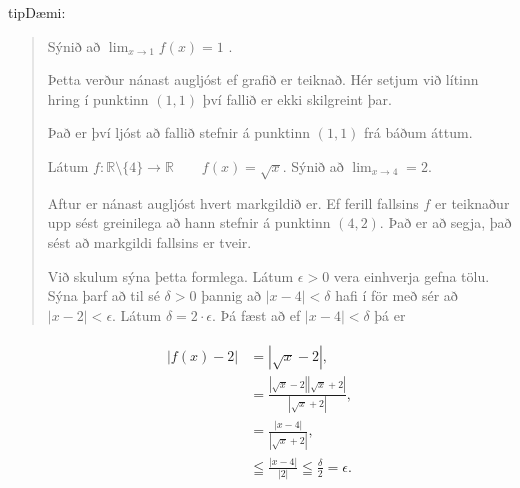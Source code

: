 \documentclass[a4paper,10pt,icelandic]{sphinxmanual}
\begin{document}
\begin{sphinxadmonition}{tip}{Dæmi:}
\begin{quote}
\begin{description}
Sýnið að \(\lim_{x \to 1} f(x) = 1\) .

Þetta verður nánast augljóst ef grafið er teiknað.
Hér setjum við lítinn hring í punktinn \((1, 1)\) því fallið er ekki skilgreint þar.

\begin{figure}[H]
\centering

\noindent{}
\end{figure}

Það er því ljóst að fallið stefnir á punktinn \((1, 1)\) frá báðum áttum.

\item[{\sphinxstylestrong{4.}}] \leavevmode
Látum \(f : \mathbb{R} \setminus \{4\} \to \mathbb{R} \qquad f(x) = \sqrt{x}\).
Sýnið að \(\lim_{x \to 4} = 2\).

Aftur er nánast augljóst hvert markgildið er.
Ef ferill fallsins \(f\) er teiknaður upp sést greinilega að hann stefnir á punktinn \((4, 2)\).
Það er að segja, það sést að markgildi fallsins er tveir.

\begin{figure}[H]
\centering

\noindent{}
\end{figure}

Við skulum sýna þetta formlega.
Látum \(\epsilon > 0\) vera einhverja gefna tölu.
Sýna þarf að til sé \(\delta>0\) þannig að \(|x−4|<\delta\) hafi í för með sér að \(| x−2|<\epsilon\). Látum \(\delta = 2 \cdot \epsilon\).
Þá fæst að ef \(|x − 4| < \delta\) þá er

\end{description}
\end{quote}
\begin{equation*}
\begin{split}\begin{aligned}
|f(x) - 2| &= |\sqrt{x} - 2|,\\
& = \frac{|\sqrt{x} - 2||\sqrt{x} + 2|}{|\sqrt{x} + 2|},\\
& = \frac{|x - 4|}{|\sqrt{x} + 2|},\\
& \leqq \frac{|x-4|}{|2|} \leqq \frac{\delta}{2} = \epsilon.
\end{aligned}\end{split}
\end{equation*}\end{sphinxadmonition}
\end{document}
